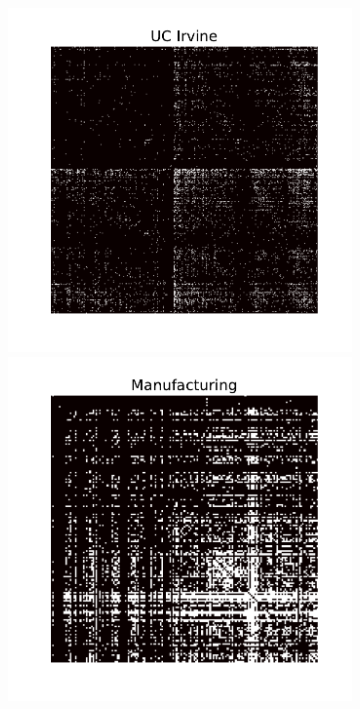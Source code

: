 
\begin{figure}[h]
        \centering
        \begin{subfigure}[b]{0.400\textwidth}
            \centering
            \includegraphics[scale=0.32]{img/irvine}
            \includegraphics[scale=0.32]{img/manufacturing}

\end{subfigure}
\end{figure}
